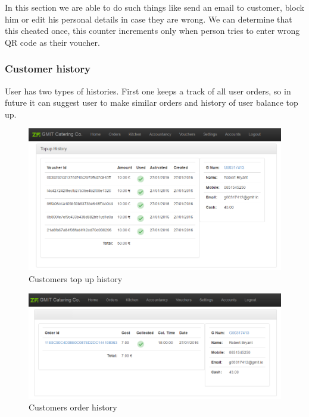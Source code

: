 		In this section we are able to do such things like send an email to customer, block him or edit his personal details in case they are wrong. We can determine that this cheated once, this counter increments only when person tries to enter wrong QR code as their voucher. 
		
		\subsubsection{Customer history}
		User has two types of histories. First one keeps a track of all user orders, so in future it can suggest user to make similar orders and history of user balance top up.
		
		
		\begin{figure}[H]
			\centering
			\includegraphics[width=1\textwidth]{img/zf2/02-customer_information_topup_history.png}
			\caption{Customers top up history}
			\label{fig:customer-topup-history}
		\end{figure}
		
		\begin{figure}[H]
			\centering
			\includegraphics[width=1\textwidth]{img/zf2/02-customer_information_order_history.png}
			\caption{Customers order history}
			\label{fig:customer-order-history}
		\end{figure}
		

